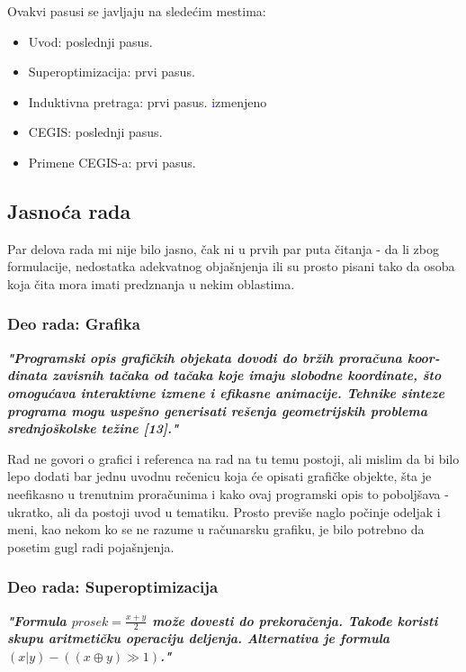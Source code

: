 \documentclass[a4paper]{report}
\newcommand{\odgovor}[1]{\textcolor{blue}{#1}}
\begin{document}
Ovakvi pasusi se javljaju na sledećim mestima:
\begin{itemize}
	\item Uvod: poslednji pasus.
    \item Superoptimizacija: prvi pasus.
    \item Induktivna pretraga: prvi pasus. \odgovor izmenjeno
    \item CEGIS: poslednji pasus.
    \item Primene CEGIS-a: prvi pasus.
\end{itemize}



\subsection{Jasnoća rada}

Par delova rada mi nije bilo jasno, čak ni u prvih par puta čitanja - da li zbog formulacije, nedostatka adekvatnog objašnjenja ili su prosto pisani tako da osoba koja čita mora imati predznanja u nekim oblastima.


\subsubsection{Deo rada: Grafika}

\textbf{\textit{"Programski opis grafičkih objekata dovodi do bržih proračuna koor-dinata zavisnih tačaka od tačaka koje imaju slobodne koordinate, što omogućava interaktivne izmene i efikasne animacije. Tehnike sinteze programa mogu uspešno generisati rešenja geometrijskih problema srednjoškolske težine [13]."}}

Rad ne govori o grafici i referenca na rad na tu temu postoji, ali mislim da bi bilo lepo dodati bar jednu uvodnu rečenicu koja će opisati grafičke objekte, šta je neefikasno u trenutnim proračunima i kako ovaj programski opis to poboljšava - ukratko, ali da postoji uvod u tematiku. Prosto previše naglo počinje odeljak i meni, kao nekom ko se ne razume u računarsku grafiku, je bilo potrebno da posetim gugl radi pojašnjenja.


\subsubsection{Deo rada: Superoptimizacija}
\textbf{\textit{"Formula $prosek = \frac{x+y}{2}$ može dovesti do prekoračenja. Takođe koristi skupu aritmetičku operaciju deljenja. Alternativa je formula $(x | y) - ((x \oplus y) \gg 1)$."}}
\end{document}
